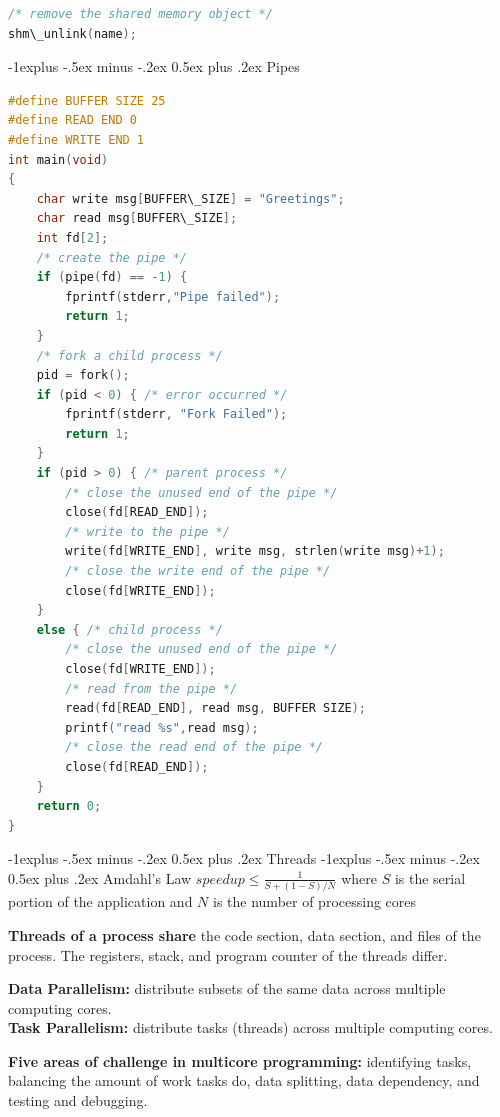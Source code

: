 \documentclass[letterpaper, 8pt]{extarticle}
\makeatletter
\renewcommand{\section}{\@startsection{section}{1}{0mm}%
                                {-1explus -.5ex minus -.2ex}%
                                {0.5ex plus .2ex}%
                                {\normalfont\normalsize\bfseries}}
\renewcommand{\subsection}{\@startsection{subsection}{2}{0mm}%
                                {-1explus -.5ex minus -.2ex}%
                                {0.5ex plus .2ex}%
                                {\normalfont\small\bfseries}}
\makeatother
\begin{document}
\begin{multicols*}{6}
\begin{lstlisting}[language=C]
/* remove the shared memory object */
shm\_unlink(name);
\end{lstlisting}

    \subsection{Pipes}
    \begin{lstlisting}[language=C]
#define BUFFER SIZE 25
#define READ END 0
#define WRITE END 1
int main(void)
{
    char write msg[BUFFER\_SIZE] = "Greetings";
    char read msg[BUFFER\_SIZE];
    int fd[2];
    /* create the pipe */
    if (pipe(fd) == -1) {
        fprintf(stderr,"Pipe failed");
        return 1;
    }
    /* fork a child process */
    pid = fork();
    if (pid < 0) { /* error occurred */
        fprintf(stderr, "Fork Failed");
        return 1;
    }
    if (pid > 0) { /* parent process */
        /* close the unused end of the pipe */
        close(fd[READ_END]);
        /* write to the pipe */
        write(fd[WRITE_END], write msg, strlen(write msg)+1);
        /* close the write end of the pipe */
        close(fd[WRITE_END]);
    }
    else { /* child process */
        /* close the unused end of the pipe */
        close(fd[WRITE_END]);
        /* read from the pipe */
        read(fd[READ_END], read msg, BUFFER SIZE);
        printf("read %s",read msg);
        /* close the read end of the pipe */
        close(fd[READ_END]);
    }
    return 0;
}
\end{lstlisting}
    \section{Threads}
    \subsection{Amdahl's Law}
    $speedup \leq \frac{1}{S+(1-S)/N}$ where $S$ is the serial
    portion of the application and $N$ is the number of processing cores

    \textbf{Threads of a process share} the code section, data section, and files
    of the process. The registers, stack, and program counter of the threads
    differ.

    \textbf{Data Parallelism:} distribute subsets of the same data across multiple
    computing cores. \\
    \textbf{Task Parallelism:} distribute tasks (threads) across multiple
    computing cores.

    \textbf{Five areas of challenge in multicore programming:} identifying tasks,
    balancing the amount of work tasks do, data splitting, data dependency,
    and testing and debugging.


\end{multicols*}
\end{document}
